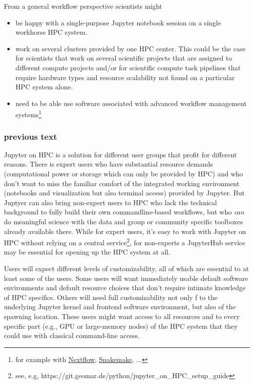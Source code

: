 From a general workflow perspective scientists might

\begin{itemize}
  \item be happy with a single-purpose Jupyter notebook session on a single workhorse HPC system.
  \item work on several clusters provided by one HPC center.
  This could be the case for scientists that work on several scientific projects that are assigned to different compute projects and/or for scientific compute task pipelines that require hardware types and resource scalability not found on a particular HPC system alone.
  \item need to be able use software associated with advanced workflow management systems\footnote{for example with \href{https://www.nextflow.io/}{Nextflow}, \href{https://snakemake.readthedocs.io/}{Snakemake}, ...}
\end{itemize}

\subsubsection{previous text}

Jupyter on HPC is a solution for different user groups that profit for different reasons.
There is expert users who have substantial resource demands (computational power or storage which can only be provided by HPC) and who don't want to miss the familiar comfort of the integrated working environment (notebooks and visualization but also terminal access) provided by Jupyter.
But Juptyer can also bring non-expert users to HPC who lack the technical background to fully build their own commandline-based workflows, but who \emph{can} do meaningful science with the data and group or community specific toolboxes already available there.
While for expert users, it's easy to work with Jupyter on HPC without relying on a central service\footnote{see, e.g, https://git.geomar.de/python/jupyter_on_HPC_setup_guide}, for non-experts a JupyterHub service may be essential for opening up the HPC system at all.

Users will expect different levels of customizability, all of which are essential to at least some of the users.
Some users will want immediately usable default software environments and default resource choices that don't require intimate knowledge of HPC specifics.
Others will need full customizability not only f to the underlying Jupyter kernel and frontend software environment, but also of the spawning location.
These users might want access to all resources and to every specific part (e.g., GPU or large-memory nodes) of the HPC system that they could use with classical command-line access.

